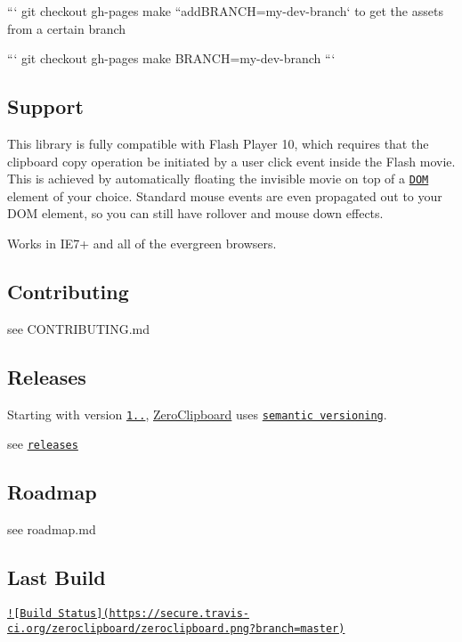 ``` git checkout gh-\/pages make ``{\ttfamily  add}B\-R\-A\-N\-C\-H=my-\/dev-\/branch` to get the assets from a certain branch

``` git checkout gh-\/pages make B\-R\-A\-N\-C\-H=my-\/dev-\/branch ```

\subsection*{Support}

This library is fully compatible with Flash Player 10, which requires that the clipboard copy operation be initiated by a user click event inside the Flash movie. This is achieved by automatically floating the invisible movie on top of a \href{http://en.wikipedia.org/wiki/Document_Object_Model}{\tt D\-O\-M} element of your choice. Standard mouse events are even propagated out to your D\-O\-M element, so you can still have rollover and mouse down effects.

Works in I\-E7+ and all of the evergreen browsers.

\subsection*{Contributing}

see C\-O\-N\-T\-R\-I\-B\-U\-T\-I\-N\-G.md

\subsection*{Releases}

Starting with version \href{https://github.com/zeroclipboard/zeroclipboard/releases/tag/v1.1.7}{\tt 1..}, \hyperlink{class_zero_clipboard}{Zero\-Clipboard} uses \href{http://semver.org/}{\tt semantic versioning}.

see \href{https://github.com/zeroclipboard/zeroclipboard/releases}{\tt releases}

\subsection*{Roadmap}

see roadmap.md

\subsection*{Last Build}

\href{https://travis-ci.org/zeroclipboard/zeroclipboard}{\tt !\mbox{[}Build Status\mbox{]}(https\-://secure.\-travis-\/ci.\-org/zeroclipboard/zeroclipboard.\-png?branch=master)} 